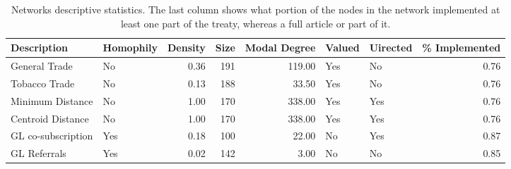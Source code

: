 \begin{table}[ht]
\centering
\begin{tabular}{llrrrllr}
  \toprule
Description & Homophily & Density & Size & Modal Degree & Valued & Uirected & \% Implemented \\ 
  \midrule
General Trade & No & 0.36 & 191 & 119.00 & Yes & No & 0.76 \\ 
  Tobacco Trade & No & 0.13 & 188 & 33.50 & Yes & No & 0.76 \\ 
  Minimum Distance & No & 1.00 & 170 & 338.00 & Yes & Yes & 0.76 \\ 
  Centroid Distance & No & 1.00 & 170 & 338.00 & Yes & Yes & 0.76 \\ 
  GL co-subscription & Yes & 0.18 & 100 & 22.00 & No & Yes & 0.87 \\ 
  GL Referrals  & Yes & 0.02 & 142 & 3.00 & No & No & 0.85 \\ 
   \bottomrule
\end{tabular}
\caption{Networks descriptive statistics. The last column shows what portion of the nodes in the network implemented at least one part of the treaty, whereas a full article or part of it.} 
\end{table}
